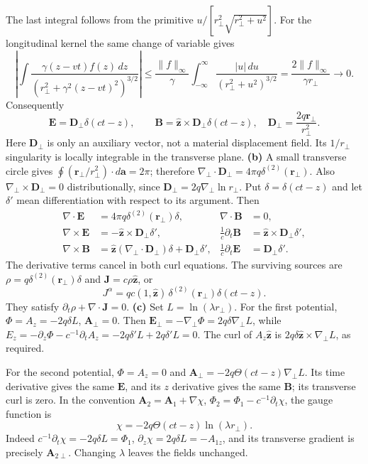 The last integral follows from the primitive
$u/[r_\perp^2\sqrt{r_\perp^2+u^2}]$. For the longitudinal kernel the same change of variable gives
\[
\left|\int\frac{\gamma(z-vt)f(z)\,dz}
{(r_\perp^2+\gamma^2(z-vt)^2)^{3/2}}\right|
\leq\frac{\|f\|_\infty}{\gamma}
\int_{-\infty}^{\infty}\frac{|u|\,du}{(r_\perp^2+u^2)^{3/2}}
=\frac{2\|f\|_\infty}{\gamma r_\perp}\longrightarrow0.
\]
Consequently
\[
\boxed{\mathbf E=\mathbf D_\perp\delta(ct-z),\qquad
\mathbf B=\hat{\mathbf z}\times\mathbf D_\perp\delta(ct-z),
\quad\mathbf D_\perp=\frac{2q\mathbf r_\perp}{r_\perp^2}.}
\]
Here $\mathbf D_\perp$ is only an auxiliary vector, not a material
displacement field. Its $1/r_\perp$ singularity is locally
integrable in the transverse plane.
\textbf{(b)} A small transverse circle gives
$\oint (\mathbf r_\perp/r_\perp^2)\cdot d\mathbf a=2\pi$;
therefore
$\nabla_\perp\cdot\mathbf D_\perp=4\pi q\delta^{(2)}(\mathbf r_\perp)$.
Also $\nabla_\perp\times\mathbf D_\perp=0$ distributionally,
since $\mathbf D_\perp=2q\nabla_\perp\ln r_\perp$.
Put $\delta=\delta(ct-z)$ and let $\delta'$ mean differentiation
with respect to its argument. Then
\begin{align*}
\nabla\cdot\mathbf E&=4\pi q\delta^{(2)}(\mathbf r_\perp)\delta,
&\nabla\cdot\mathbf B&=0,\\
\nabla\times\mathbf E&=-\hat{\mathbf z}\times\mathbf D_\perp\delta',
&\frac1c\partial_t\mathbf B&=\hat{\mathbf z}\times\mathbf D_\perp\delta',\\
\nabla\times\mathbf B&=\hat{\mathbf z}
(\nabla_\perp\cdot\mathbf D_\perp)\delta+\mathbf D_\perp\delta',
&\frac1c\partial_t\mathbf E&=\mathbf D_\perp\delta'.
\end{align*}
The derivative terms cancel in both curl equations. The surviving
sources are $\rho=q\delta^{(2)}(\mathbf r_\perp)\delta$ and
$\mathbf J=c\rho\hat{\mathbf z}$, or
\[
\boxed{J^\alpha=qc(1,\hat{\mathbf z})\,
\delta^{(2)}(\mathbf r_\perp)\delta(ct-z).}
\]
They satisfy $\partial_t\rho+\nabla\cdot\mathbf J=0$.
\textbf{(c)} Set $L=\ln(\lambda r_\perp)$. For the first potential,
$\Phi=A_z=-2q\delta L$, $\mathbf A_\perp=0$.
Then $\mathbf E_\perp=-\nabla_\perp\Phi=2q\delta\nabla_\perp L$,
while
$E_z=-\partial_z\Phi-c^{-1}\partial_tA_z
=-2q\delta'L+2q\delta'L=0$.
The curl of $A_z\hat{\mathbf z}$ is
$2q\delta\hat{\mathbf z}\times\nabla_\perp L$, as required.

For the second potential, $\Phi=A_z=0$ and
$\mathbf A_\perp=-2q\Theta(ct-z)\nabla_\perp L$.
Its time derivative gives the same $\mathbf E$, and its
$z$ derivative gives the same $\mathbf B$; its transverse curl
is zero. In the convention
$\mathbf A_2=\mathbf A_1+\nabla\chi$,
$\Phi_2=\Phi_1-c^{-1}\partial_t\chi$, the gauge function is
\[
\boxed{\chi=-2q\Theta(ct-z)\ln(\lambda r_\perp).}
\]
Indeed $c^{-1}\partial_t\chi=-2q\delta L=\Phi_1$,
$\partial_z\chi=2q\delta L=-A_{1z}$, and its transverse gradient
is precisely $\mathbf A_{2\perp}$. Changing $\lambda$ leaves the
fields unchanged.

